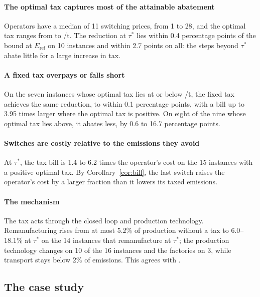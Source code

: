 \documentclass[review,11pt,nonatbib]{elsarticle}
\theoremstyle{remark}
\newcommand{\Eref}{E_{\mathrm{ref}}}
\newcommand{\EUR}{\texteuro}
\begin{document}
\paragraph{The optimal tax captures most of the attainable abatement} Operators have a median of 11 switching prices, from 1 to 28, and the optimal tax ranges from \EUR0 to \EUR196.2/t. The reduction at $\tau^*$ lies within 0.4 percentage points of the bound at $\Eref$ on 10 instances and within 2.7 points on all: the steps beyond $\tau^*$ abate little for a large increase in tax.

\paragraph{A fixed tax overpays or falls short} On the seven instances whose optimal tax lies at or below \EUR74/t, the fixed tax achieves the same reduction, to within 0.1 percentage points, with a bill up to 3.95 times larger where the optimal tax is positive. On eight of the nine whose optimal tax lies above, it abates less, by 0.6 to 16.7 percentage points.

\paragraph{Switches are costly relative to the emissions they avoid} At $\tau^*$, the tax bill is 1.4 to 6.2 times the operator's cost on the 15 instances with a positive optimal tax. By Corollary~\ref{cor:bill}, the last switch raises the operator's cost by a larger fraction than it lowers its taxed emissions.

\paragraph{The mechanism} The tax acts through the closed loop and production technology. Remanufacturing rises from at most 5.2\% of production without a tax to 6.0--18.1\% at $\tau^*$ on the 14 instances that remanufacture at $\tau^*$; the production technology changes on 10 of the 16 instances and the factories on 3, while transport stays below 2\% of emissions. This agrees with \textcite{yenipazarli2016managing}.

\subsection{The case study}\label{sec:sens-case}
\end{document}
